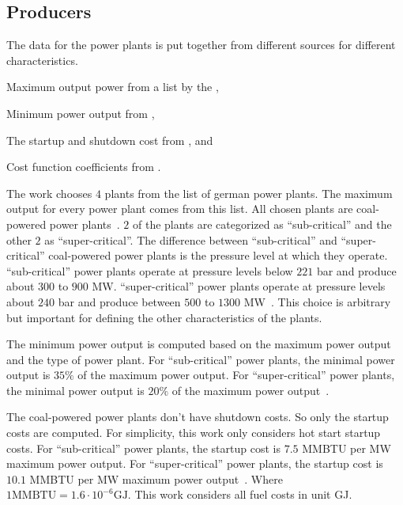 \subsection{Producers}

The data for the power plants is put together from different sources for different characteristics.
\begin{enumerate*}[label=(\roman*)]
  \item Maximum output power from a list by the \citeauthor{Kraftwerkliste2020},
  \item Minimum power output from \citeauthor{Schroder2013},
  \item The startup and shutdown cost from \citeauthor{Kumar2012}, and
  \item Cost function coefficients from \citeauthor{Alrashidi2009}.
\end{enumerate*}

The work chooses $4$ plants from the list of german power plants.
The maximum output for every power plant comes from this list.
All chosen plants are coal-powered power plants~\cite{Kraftwerkliste2020}.
$2$ of the plants are categorized as ``sub-critical'' and the other $2$ as ``super-critical''.
The difference between ``sub-critical'' and ``super-critical'' coal-powered power plants is the pressure level at which they operate.
``sub-critical'' power plants operate at pressure levels below $221$ bar and produce about $300$ to $900$ MW.
``super-critical'' power plants operate at pressure levels about $240$ bar and produce between $500$ to $1300$ MW~\cite{Kumar2012, Schroder2013}.
This choice is arbitrary but important for defining the other characteristics of the plants.

The minimum power output is computed based on the maximum power output and the type of power plant.
For ``sub-critical'' power plants, the minimal power output is $35\%$ of the maximum power output.
For ``super-critical'' power plants, the minimal power output is $20\%$ of the maximum power output~\cite{Schroder2013}.

The coal-powered power plants don't have shutdown costs.
So only the startup costs are computed.
For simplicity, this work only considers hot start startup costs.
For ``sub-critical'' power plants, the startup cost is $7.5$ MMBTU per MW maximum power output.
For ``super-critical'' power plants, the startup cost is $10.1$ MMBTU per MW maximum power output~\cite{Kumar2012}.
Where $1 \text{MMBTU} = 1.6 \cdot 10^{-6} \text{GJ}$.
This work considers all fuel costs in unit GJ.

